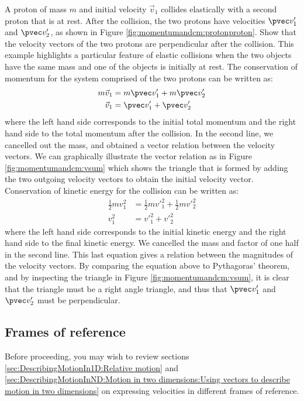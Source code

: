 \begin{example}{
 A proton of mass $m$ and initial velocity $\vec v_1$ collides elastically with a second proton that is at rest. After the collision, the two protons have velocities $\pvec v'_1$ and $\pvec v'_2$, as shown in Figure \ref{fig:momentumandcm:protonproton}. Show that the velocity vectors of the two protons are perpendicular after the collision.}
This example highlights a particular feature of elastic collisions when the two objects have the same mass and one of the objects is initially at rest. The conservation of momentum for the system comprised of the two protons can be written as:
\begin{align*}
m\vec v_1 &= m\pvec v'_1 + m\pvec v'_2\\
\vec v_1 &= \pvec v'_1 + \pvec v'_2
\end{align*}
where the left hand side corresponds to the initial total momentum and the right hand side to the total momentum after the collision. In the second line, we cancelled out the mass, and obtained a vector relation between the velocity vectors. We can graphically illustrate the vector relation as in Figure \ref{fig:momentumandcm:vsum} which shows the triangle that is formed by adding the two outgoing velocity vectors to obtain the initial velocity vector.
Conservation of kinetic energy for the collision can be written as:
\begin{align*}
\frac{1}{2}mv_1^2 &= \frac{1}{2}mv'^2_1+\frac{1}{2}mv'^2_2\\
v_1^2 &= v'^2_1+ v'^2_2
\end{align*}
where the left hand side corresponds to the initial kinetic energy and the right hand side to the final kinetic energy. We cancelled the mass and factor of one half in the second line. This last equation gives a relation between the magnitudes of the velocity vectors. By comparing the equation above to Pythagoras' theorem, and by inspecting the triangle in Figure \ref{fig:momentumandcm:vsum}, it is clear that the triangle must be a right angle triangle, and thus that $\pvec v'_1$ and $\pvec v'_2$ must be perpendicular.
\end{example}

\subsection{Frames of reference}
\begin{review}
Before proceeding, you may wish to review sections \ref{sec:DescribingMotionIn1D:Relative motion} and  \ref{sec:DescribingMotionInND:Motion in two dimensions:Using vectors to describe motion in two dimensions} on expressing velocities in different frames of reference.
\end{review}

